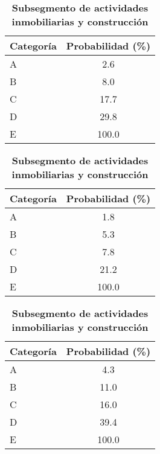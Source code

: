 \begin{table}[H]
\centering
\begin{subtable}[t]{0.32\textwidth}
\centering
\begin{tabular}{@{}lc@{}}
\toprule
\textbf{Categoría} & \textbf{Probabilidad (\%)} \\
\midrule
A & 2.6 \\
B & 8.0 \\
C & 17.7 \\
D & 29.8 \\
E & 100.0 \\
\bottomrule
\end{tabular}
\caption{\textbf{Subsegmento de comercio}}
\end{subtable}
\hfill
\begin{subtable}[t]{0.32\textwidth}
\centering
\begin{tabular}{@{}lc@{}}
\toprule
\textbf{Categoría} & \textbf{Probabilidad (\%)} \\
\midrule
A & 1.8 \\
B & 5.3 \\
C & 7.8 \\
D & 21.2 \\
E & 100.0 \\
\bottomrule
\end{tabular}
\caption{\textbf{Subsegmento de industrias manufactureras}}
\end{subtable}
\hfill
\begin{subtable}[t]{0.32\textwidth}
\centering
\begin{tabular}{@{}lc@{}}
\toprule
\textbf{Categoría} & \textbf{Probabilidad (\%)} \\
\midrule
A & 4.3 \\
B & 11.0 \\
C & 16.0 \\
D & 39.4 \\
E & 100.0 \\
\bottomrule
\end{tabular}
\caption{\textbf{Subsegmento de actividades inmobiliarias y construcción}}
\end{subtable}


\end{table}
